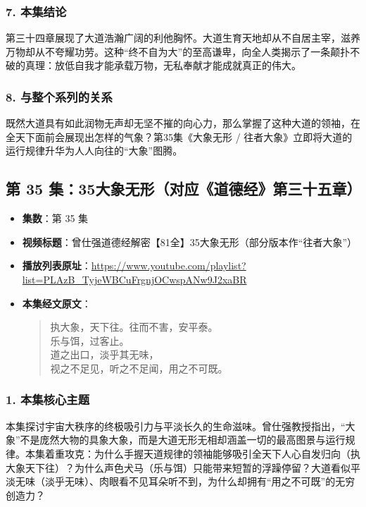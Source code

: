 \subsubsection{7. 本集结论}
第三十四章展现了大道浩瀚广阔的利他胸怀。大道生育天地却从不自居主宰，滋养万物却从不夸耀功劳。这种“终不自为大”的至高谦卑，向全人类揭示了一条颠扑不破的真理：放低自我才能承载万物，无私奉献才能成就真正的伟大。

\subsubsection{8. 与整个系列的关系}
既然大道具有如此润物无声却无坚不摧的向心力，那么掌握了这种大道的领袖，在全天下面前会展现出怎样的气象？第35集《大象无形 / 往者大象》立即将大道的运行规律升华为人人向往的“大象”图腾。

\clearpage

\subsection{第 35 集：35大象无形（对应《道德经》第三十五章）}
\label{sec:ep35}

\begin{itemize}
    \item \textbf{集数}：第 35 集
    \item \textbf{视频标题}：曾仕强道德经解密【81全】35大象无形（部分版本作“往者大象”）
    \item \textbf{播放列表原址}：\url{https://www.youtube.com/playlist?list=PLAzB_TyjeWBCuFrgnjOCwspANw9J2xaBR}
    \item \textbf{本集经文原文}：
    \begin{quote}\kaishu
    执大象，天下往。往而不害，安平泰。\\
    乐与饵，过客止。\\
    道之出口，淡乎其无味，\\
    视之不足见，听之不足闻，用之不可既。
    \end{quote}
\end{itemize}

\subsubsection{1. 本集核心主题}
本集探讨宇宙大秩序的终极吸引力与平淡长久的生命滋味。曾仕强教授指出，“大象”不是庞然大物的具象大象，而是大道无形无相却涵盖一切的最高图景与运行规律。本集着重攻克：为什么手握天道规律的领袖能够吸引全天下人心自发归向（执大象天下往）？为什么声色犬马（乐与饵）只能带来短暂的浮躁停留？大道看似平淡无味（淡乎无味）、肉眼看不见耳朵听不到，为什么却拥有“用之不可既”的无穷创造力？

